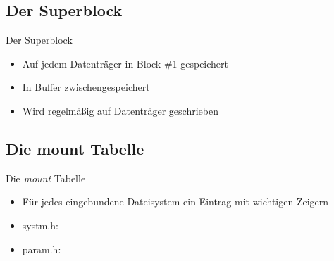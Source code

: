 \documentclass{beamer}
\begin{document}


\subsection{Der Superblock}

\begin{frame}{Der Superblock}
    \begin{itemize}
        \item Auf jedem Datenträger in Block \#1 gespeichert
        \item In Buffer zwischengespeichert
        \item Wird regelmäßig auf Datenträger geschrieben
    \end{itemize}

    \vfill

    
\end{frame}




\subsection{Die mount Tabelle}

\begin{frame}{Die \emph{mount} Tabelle}
    \begin{itemize}
        \item Für jedes eingebundene Dateisystem ein Eintrag mit wichtigen Zeigern

        \vfill

        \item systm.h:
            \vspace{5pt}
            

        \vfill

        \item param.h:
            \vspace{5pt}
            

        \vfill
    \end{itemize}
\end{frame}


\end{document}
